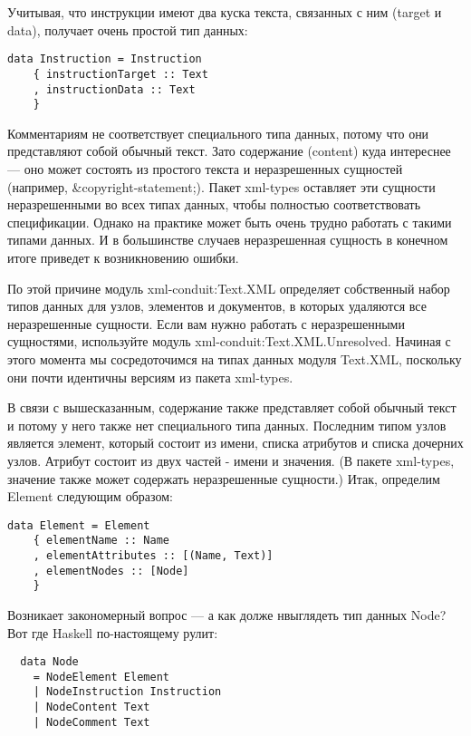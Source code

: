 Учитывая, что инструкции имеют два куска текста, связанных с ним (target и data), получает очень простой тип данных:

\begin{lstlisting}
data Instruction = Instruction
    { instructionTarget :: Text
    , instructionData :: Text
    }
\end{lstlisting}

Комментариям не соответствует специального типа данных, потому что они представляют собой обычный текст. Зато содержание (content) куда интереснее --- оно может состоять из простого текста и неразрешенных сущностей (например, \&copyright-statement;). Пакет xml-types оставляет эти сущности неразрешенными во всех типах данных, чтобы полностью соответствовать спецификации. Однако на практике может быть очень трудно работать с такими типами данных. И в большинстве случаев неразрешенная сущность в конечном итоге приведет к возникновению ошибки.

По этой причине модуль xml-conduit:Text.XML определяет собственный набор типов данных для узлов, элементов и документов, в которых удаляются все неразрешенные сущности. Если вам нужно работать с неразрешенными сущностями, используйте модуль xml-conduit:Text.XML.Unresolved. Начиная с этого момента мы сосредоточимся на типах данных модуля Text.XML, поскольку они почти идентичны версиям из пакета xml-types.

В связи с вышесказанным, содержание также представляет собой обычный текст и потому у него также нет специального типа данных. Последним типом узлов является элемент, который состоит из имени, списка атрибутов и списка дочерних узлов. Атрибут состоит из двух частей - имени и значения. (В пакете xml-types, значение также может содержать неразрешенные сущности.) Итак, определим Element следующим образом:

\begin{lstlisting}
data Element = Element
    { elementName :: Name
    , elementAttributes :: [(Name, Text)]
    , elementNodes :: [Node]
    }
\end{lstlisting}

Возникает закономерный вопрос --- а как долже нвыглядеть тип данных Node? Вот где Haskell по-настоящему рулит: %

\begin{lstlisting}
  data Node
    = NodeElement Element
    | NodeInstruction Instruction
    | NodeContent Text
    | NodeComment Text
\end{lstlisting}

